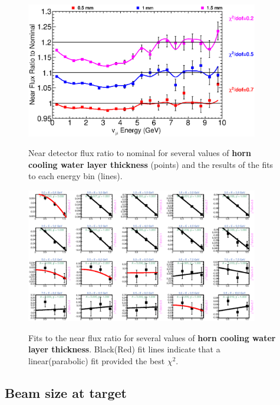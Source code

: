\begin{figure}[ht]
  \begin{center}
    {\includegraphics[width=4.0in]{figures/NominalWaterLayer__near_summary.eps}}
  \end{center}
\caption{ Near detector flux ratio to nominal for several values of {\bf horn cooling water layer thickness} (points) and the results of the fits to each energy bin (lines).}
\end{figure}

\begin{figure}[hb]
  \begin{center}
    {\includegraphics[width=4.0in]{figures/NominalWaterLayer__near_fits.eps}}
  \end{center}
\caption{ Fits to the near flux ratio for several values of {\bf horn cooling water layer thickness}. Black(Red) fit lines indicate that a linear(parabolic) fit provided the best $\chi^2$. }
\end{figure}

\clearpage
\subsection{Beam size at target}

